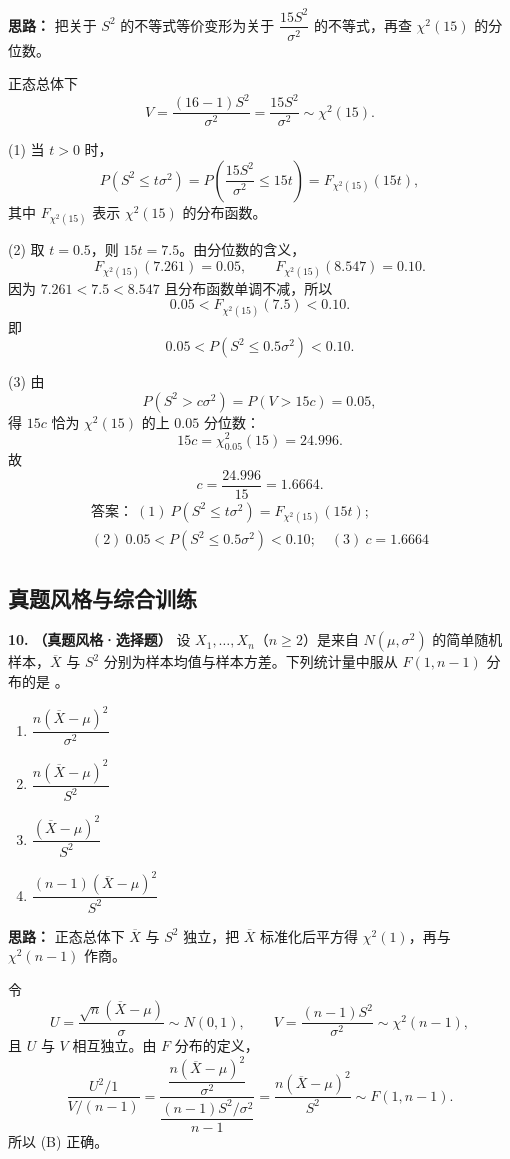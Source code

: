 \ifshowsolutions%
\textbf{思路：} 把关于 $S^2$ 的不等式等价变形为关于 $\dfrac{15S^2}{\sigma^2}$ 的不等式，再查 $\chi^2(15)$ 的分位数。

正态总体下
\[
V=\frac{(16-1)S^2}{\sigma^2}=\frac{15S^2}{\sigma^2}\sim\chi^2(15).
\]

(1) 当 $t>0$ 时，
\[
P(S^2\leq t\sigma^2)
=P\!\left(\frac{15S^2}{\sigma^2}\leq 15t\right)
=F_{\chi^2(15)}(15t),
\]
其中 $F_{\chi^2(15)}$ 表示 $\chi^2(15)$ 的分布函数。

(2) 取 $t=0.5$，则 $15t=7.5$。由分位数的含义，
\[
F_{\chi^2(15)}(7.261)=0.05,\qquad
F_{\chi^2(15)}(8.547)=0.10.
\]
因为 $7.261<7.5<8.547$ 且分布函数单调不减，所以
\[
0.05<F_{\chi^2(15)}(7.5)<0.10.
\]
即
\[
0.05<P(S^2\leq0.5\sigma^2)<0.10.
\]

(3) 由
\[
P(S^2>c\sigma^2)
=P(V>15c)=0.05,
\]
得 $15c$ 恰为 $\chi^2(15)$ 的上 $0.05$ 分位数：
\[
15c=\chi^2_{0.05}(15)=24.996.
\]
故
\[
c=\frac{24.996}{15}=1.6664.
\]
\[
\boxed{\begin{gathered}
\text{答案：}\ (1)\ P(S^2\leq t\sigma^2)=F_{\chi^2(15)}(15t);\\
(2)\ 0.05<P(S^2\leq0.5\sigma^2)<0.10;\quad
(3)\ c=1.6664
\end{gathered}}
\]
\else \answerarea[8] \fi%

\newpage
\subsection{真题风格与综合训练}

\textbf{10.} \textbf{（真题风格·选择题）} 设 $X_1,\ldots,X_n$（$n\geq 2$）是来自 $N(\mu,\sigma^2)$ 的简单随机样本，$\overline{X}$ 与 $S^2$ 分别为样本均值与样本方差。下列统计量中服从 $F(1,n-1)$ 分布的是 \underline{\qquad}。
\begin{enumerate}[label=(\Alph*)]
    \item $\dfrac{n(\overline{X}-\mu)^2}{\sigma^2}$
    \item $\dfrac{n(\overline{X}-\mu)^2}{S^2}$
    \item $\dfrac{(\overline{X}-\mu)^2}{S^2}$
    \item $\dfrac{(n-1)(\overline{X}-\mu)^2}{S^2}$
\end{enumerate}

\ifshowsolutions%
\textbf{思路：} 正态总体下 $\overline{X}$ 与 $S^2$ 独立，把 $\overline{X}$ 标准化后平方得 $\chi^2(1)$，再与 $\chi^2(n-1)$ 作商。

令
\[
U=\frac{\sqrt{n}(\overline{X}-\mu)}{\sigma}\sim N(0,1),\qquad
V=\frac{(n-1)S^2}{\sigma^2}\sim\chi^2(n-1),
\]
且 $U$ 与 $V$ 相互独立。由 $F$ 分布的定义，
\[
\frac{U^2/1}{V/(n-1)}
=\frac{\dfrac{n(\overline{X}-\mu)^2}{\sigma^2}}
{\dfrac{(n-1)S^2/\sigma^2}{n-1}}
=\frac{n(\overline{X}-\mu)^2}{S^2}\sim F(1,n-1).
\]
所以 (B) 正确。

